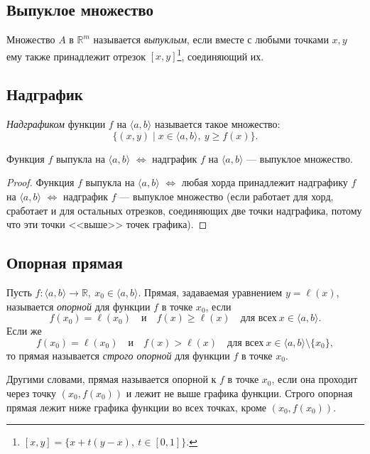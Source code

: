 \subsection{Выпуклое множество}

\begin{definition}
	Множество \(A\) в \(\mathbb{R}^m\) называется \textit{выпуклым}, если вместе с любыми точками \(x, y\) ему также принадлежит отрезок \([x, y]\)\footnote{\([x, y] = \{x + t(y - x), \ t \in [0, 1]\}\).}, соединяющий их.
\end{definition}

\subsection{Надграфик}

\begin{definition}
	\textit{Надграфиком} функции \(f\) на \(\langle a, b \rangle\) называется такое множество: \[
	\{(x, y) \mid x \in \langle a, b \rangle, \ y \geqslant f(x)\}.
	\]
\end{definition}

\begin{remark}
	Функция \(f\) выпукла на \(\langle a, b \rangle\) \(\Leftrightarrow\) надграфик \(f\) на \(\langle a, b \rangle\) --- выпуклое множество.
\end{remark}
\begin{proof}
	Функция \(f\) выпукла на \(\langle a, b \rangle\) \(\Leftrightarrow\) любая хорда принадлежит надграфику \(f\) на \(\langle a, b \rangle\) \(\Leftrightarrow\) надграфик \(f\) --- выпуклое множество (если работает для хорд, сработает и для остальных отрезков, соединяющих две точки надграфика, потому что эти точки <<выше>> точек графика).
\end{proof}

\subsection{Опорная прямая}

\begin{definition}
	Пусть \(f \colon \langle a, b \rangle \to \mathbb{R}, \ x_0 \in \langle a, b \rangle\). Прямая, задаваемая уравнением \(y = \ell(x)\), называется \textit{опорной} для функции  \(f\) в точке \(x_0\), если \[
	f(x_0) = \ell(x_0) \quad \text{и} \quad f(x) \geqslant \ell(x) \quad \text{для всех} \ x \in \langle a, b \rangle. 
	\]
	Если же \[
	f(x_0) = \ell(x_0) \quad \text{и} \quad f(x) > \ell(x) \quad \text{для всех} \ x \in \langle a, b \rangle \setminus \{x_0\},
	\]
	то прямая называется \textit{строго опорной} для функции \(f\) в точке \(x_0\).
	
	Другими словами, прямая называется опорной к \(f\) в точке \(x_0\), если она проходит через точку \((x_0, f(x_0))\) и лежит не выше графика функции. Строго опорная прямая лежит ниже графика функции во всех точках, кроме \((x_0, f(x_0))\).
\end{definition}

